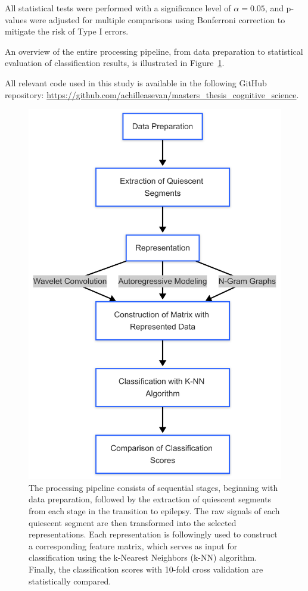 \documentclass{article}
\begin{document}
All statistical tests were performed with a significance level of $\alpha = 0.05$, and p-values were adjusted for multiple comparisons using Bonferroni correction to mitigate the risk of Type I errors.

An overview of the entire processing pipeline, from data preparation to statistical evaluation of classification results, is illustrated in Figure~\ref{fig:pipeline}.

All relevant code used in this study is available in the following GitHub repository: \url{https://github.com/achilleasevan/masters_thesis_cognitive_science}.

\begin{figure}[htbp]
	\centering
	\includegraphics[width=0.9\linewidth]{PIPES.png}
	\caption[Overview of the processing and classification pipeline]{The processing pipeline consists of sequential stages, beginning with data preparation, followed by the extraction of quiescent segments from each stage in the transition to epilepsy. The raw signals of each quiescent segment are then transformed into the selected representations. Each representation is followingly used to construct a corresponding feature matrix, which serves as input for classification using the k-Nearest Neighbors (k-NN) algorithm. Finally, the classification scores with 10-fold cross validation are statistically compared.}
	\label{fig:pipeline}
\end{figure}
\end{document}
